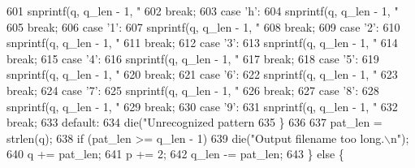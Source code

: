 \begin{DoxyCodeInclude}
{{{{{{{{{{{601           snprintf(q, q\_len - 1, \textcolor{stringliteral}{"%
602           \textcolor{keywordflow}{break};
603         \textcolor{keywordflow}{case} \textcolor{charliteral}{'h'}:
604           snprintf(q, q\_len - 1, \textcolor{stringliteral}{"%
605           \textcolor{keywordflow}{break};
606         \textcolor{keywordflow}{case} \textcolor{charliteral}{'1'}:
607           snprintf(q, q\_len - 1, \textcolor{stringliteral}{"%
608           \textcolor{keywordflow}{break};
609         \textcolor{keywordflow}{case} \textcolor{charliteral}{'2'}:
610           snprintf(q, q\_len - 1, \textcolor{stringliteral}{"%
611           \textcolor{keywordflow}{break};
612         \textcolor{keywordflow}{case} \textcolor{charliteral}{'3'}:
613           snprintf(q, q\_len - 1, \textcolor{stringliteral}{"%
614           \textcolor{keywordflow}{break};
615         \textcolor{keywordflow}{case} \textcolor{charliteral}{'4'}:
616           snprintf(q, q\_len - 1, \textcolor{stringliteral}{"%
617           \textcolor{keywordflow}{break};
618         \textcolor{keywordflow}{case} \textcolor{charliteral}{'5'}:
619           snprintf(q, q\_len - 1, \textcolor{stringliteral}{"%
620           \textcolor{keywordflow}{break};
621         \textcolor{keywordflow}{case} \textcolor{charliteral}{'6'}:
622           snprintf(q, q\_len - 1, \textcolor{stringliteral}{"%
623           \textcolor{keywordflow}{break};
624         \textcolor{keywordflow}{case} \textcolor{charliteral}{'7'}:
625           snprintf(q, q\_len - 1, \textcolor{stringliteral}{"%
626           \textcolor{keywordflow}{break};
627         \textcolor{keywordflow}{case} \textcolor{charliteral}{'8'}:
628           snprintf(q, q\_len - 1, \textcolor{stringliteral}{"%
629           \textcolor{keywordflow}{break};
630         \textcolor{keywordflow}{case} \textcolor{charliteral}{'9'}:
631           snprintf(q, q\_len - 1, \textcolor{stringliteral}{"%
632           \textcolor{keywordflow}{break};
633         \textcolor{keywordflow}{default}:
634           die(\textcolor{stringliteral}{"Unrecognized pattern %
635       \}
636 
637       pat\_len = strlen(q);
638       \textcolor{keywordflow}{if} (pat\_len >= q\_len - 1)
639         die(\textcolor{stringliteral}{"Output filename too long.\(\backslash\)n"});
640       q += pat\_len;
641       p += 2;
642       q\_len -= pat\_len;
643     \} \textcolor{keywordflow}{else} \{
}}}}}}}}}}}}}}}}}}}}}}}
\end{DoxyCodeInclude}
